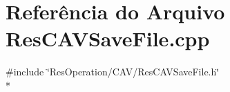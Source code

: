 \section{Referência do Arquivo Res\+C\+A\+V\+Save\+File.\+cpp}
\label{_c_a_v_2_res_c_a_v_save_file_8cpp}
{\ttfamily \#include \char`\"{}Res\+Operation/\+C\+A\+V/\+Res\+C\+A\+V\+Save\+File.\+h\char`\"{}}\\*
